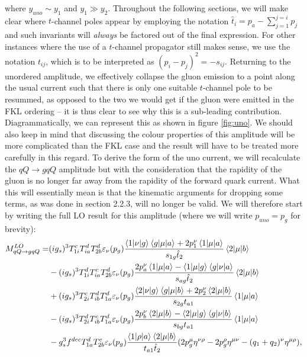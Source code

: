 where $y_{uno} \sim y_1$ and $y_1 \gg y_2$. Throughout the following sections, we will make clear where $t$-channel poles appear by employing the notation $\hat{t}_i = p_a - \sum_{j=1}^{j=i} p_j$ and such invariants will \emph{always} be factored out of the final expression. For other instances where the use of a $t$-channel propagator still makes sense, we use the notation $t_{ij}$, which is to be interpreted as $(p_i-p_j)^2 = -s_{ij}$. Returning to the unordered amplitude, we effectively collapse the gluon emission to a point along the usual current such that there is only one suitable $t$-channel pole to be resummed, as opposed to the two we would get if the gluon were emitted in the FKL ordering -- it is thus clear to see why this is a sub-leading contribution. Diagrammatically, we can represent this as shown in figure \ref{fig:uno}. We should also keep in mind that discussing the colour properties of this amplitude will be more complicated than the FKL case and the result will have to be treated more carefully in this regard. To derive the form of the uno current, we will recalculate the $qQ \to gqQ$ amplitude but with the consideration that the rapidity of the gluon is no longer far away from the rapidity of the forward quark current. What this will essentially mean is that the kinematic arguments for dropping some terms, as was done in section 2.2.3, will no longer be valid. We will therefore start by writing the full LO result for this amplitude (where we will write $p_{uno} = p_g$ for brevity):
\begin{equation}
\begin{split}
M_{qQ \to gqQ}^{LO} =& (ig_s)^3 T^c_{1i}T_{ia}^d T^d_{2b} \varepsilon_{\nu}(p_g) \frac{\mathinner{\langle1\vert\nu\vert g\rangle}_{}\mathinner{\langle g\vert\mu\vert a\rangle}_{} + 2p_1^\nu \mathinner{\langle1\vert\mu\vert a\rangle}_{}}{s_{1g}\hat{t}_2}\mathinner{\langle2\vert\mu\vert b\rangle}_{} \\
 &- (ig_s)^3 T^d_{1i}T_{ia}^c T^d_{2b} \varepsilon_{\nu}(p_g) \frac{2p_a^\nu \mathinner{\langle1\vert\mu\vert a\rangle}_{} - \mathinner{\langle1\vert\mu\vert g\rangle}_{}\mathinner{\langle g\vert\nu\vert a\rangle}_{}}{s_{ag}\hat{t}_2}\mathinner{\langle2\vert\mu\vert b\rangle}_{} \\
 &+ (ig_s)^3 T^c_{2i}T_{ib}^d T^d_{1a} \varepsilon_{\nu}(p_g) \frac{\mathinner{\langle2\vert\nu\vert g\rangle}_{}\mathinner{\langle g\vert\mu\vert b\rangle}_{} + 2p_2^\nu \mathinner{\langle2\vert\mu\vert b\rangle}_{}}{s_{2g}t_{a1}}\mathinner{\langle1\vert\mu\vert a\rangle}_{} \\
  &- (ig_s)^3 T^d_{2i}T_{ib}^c T^d_{1a} \varepsilon_{\nu}(p_g) \frac{2p_b^\nu \mathinner{\langle2\vert\mu\vert b\rangle}_{} - \mathinner{\langle2\vert\mu\vert g\rangle}_{}\mathinner{\langle g\vert\nu\vert b\rangle}_{}}{s_{bg}t_{a1}}\mathinner{\langle1\vert\mu\vert a\rangle}_{} \\
  &-g_s^3 f^{dec}T^d_{1a}T^e_{2b} \varepsilon_\nu(p_g) \frac{\mathinner{\langle1\vert\rho\vert a\rangle}_{}\mathinner{\langle2\vert\mu\vert b\rangle}_{}}{t_{a1} \hat{t}_2}(2p_g^\mu \eta^{\nu \rho} - 2p_g^\rho \eta^{\mu \nu} - (q_1 + q_2)^\nu \eta^{\mu \rho}),
\end{split}
\end{equation}
